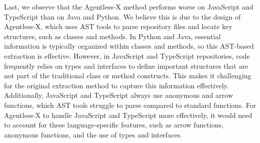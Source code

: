 Last, we observe that the Agentless-X method performs worse on JavaScript and TypeScript than on Java and Python. We believe this is due to the design of Agentless-X, which uses AST tools to parse repository files and locate key structures, such as classes and methods. In Python and Java, essential information is typically organized within classes and methods, so this AST-based extraction is effective. However, in JavaScript and TypeScript repositories, code frequently relies on types and interfaces to define important structures that are not part of the traditional class or method constructs. This makes it challenging for the original extraction method to capture this information effectively. Additionally, JavaScript and TypeScript always use anonymous and arrow functions, which AST tools struggle to parse compared to standard functions. For Agentless-X to handle JavaScript and TypeScript more effectively, it would need to account for these language-specific features, such as arrow functions, anonymous functions, and the use of types and interfaces.

